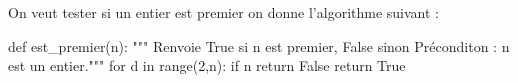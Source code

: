 

On veut tester si un entier  est premier on donne l'algorithme suivant :




\begin{pyverbatim}
def est_premier(n):
    """ Renvoie True si n est premier, False sinon
        Préconditon : n est un entier."""
    for d in range(2,n):
        if n %
            return False
    return True
\end{pyverbatim}

